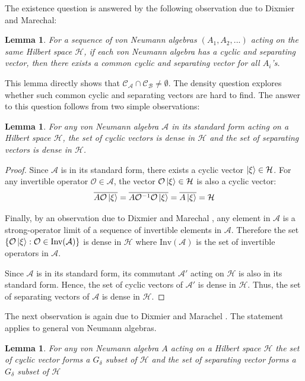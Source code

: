 \documentclass[a4paper,11pt]{article}
\newtheorem{lemma}[theorem]{Lemma}
\theoremstyle{definition}
\begin{document}
The existence question is answered by the following observation due to Dixmier and Marechal\cite{dixmiermarechal}:
\begin{lemma}
    For a sequence of von Neumann algebras $(A_1,A_2,...)$ acting on the same Hilbert space $\mathcal{H}$, if each von Neumann algebra has a cyclic and separating vector, then there exists a common cyclic and separating vector for all $A_i$'s. 
\end{lemma}
This lemma directly shows that $\mathcal{C}_\mathcal{A}\cap\mathcal{C}_\mathcal{B} \neq \emptyset$. The density question explores whether such common cyclic and separating vectors are hard to find. The answer to this question follows from two simple observations:
\begin{lemma}
    For any von Neumann algebra $\mathcal{A}$ in its standard form acting on a Hilbert space $\mathcal{H}$, the set of cyclic vectors is dense in $\mathcal{H}$ and the set of separating vectors is dense in $\mathcal{H}$.
\end{lemma}
\begin{proof}
    Since $\mathcal{A}$ is in its standard form, there exists a cyclic vector $\ket{\xi}\in\mathcal{H}$. For any invertible operator $\mathcal{O}\in\mathcal{A}$, the vector $\mathcal{O}\ket{\xi}\in\mathcal{H}$ is also a cyclic vector:
    \begin{equation}
        \overline{A\mathcal{O}\ket{\xi}} = \overline{A\mathcal{O}^{-1}\mathcal{O}\ket{\xi}} = \overline{A\ket{\xi}} = \mathcal{H}
    \end{equation}
    
    Finally, by an observation due to Dixmier and Marechal \cite{dixmiermarechal}, any element in $\mathcal{A}$ is a strong-operator limit of a sequence of invertible elements in $\mathcal{A}$. Therefore the set $\{\mathcal{O}\ket{\xi}: \mathcal{O}\in \text{Inv}(\mathcal{A})\}$ is dense in $\mathcal{H}$ where $\text{Inv}(\mathcal{A})$ is the set of invertible operators in $\mathcal{A}$.

    Since $\mathcal{A}$ is in its standard form, its commutant $\mathcal{A}'$ acting on $\mathcal{H}$ is also in its standard form. Hence, the set of cyclic vectors of $\mathcal{A}'$ is dense in $\mathcal{H}$. Thus, the set of separating vectors of $\mathcal{A}$ is dense in $\mathcal{H}$.
\end{proof}
The next observation is again due to Dixmier and Marachel \cite{dixmiermarechal}. The statement applies to general von Neumann algebras.
\begin{lemma}
    For any von Neumann algebra $A$ acting on a Hilbert space $\mathcal{H}$ the set of cyclic vector forms a $G_\delta$ subset of $\mathcal{H}$ and the set of separating vector forms a $G_\delta$ subset of $\mathcal{H}$
\end{lemma}
\end{document}
